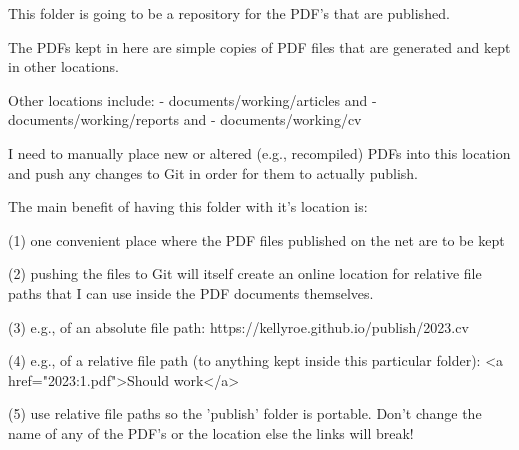 This folder  is going to be a repository for the PDF's that are published.

The PDFs kept in here are simple copies of PDF files that are generated and kept in other locations.

Other locations include: 
- documents/working/articles and 
- documents/working/reports and 
- documents/working/cv

I need to manually place new or altered (e.g., recompiled) PDFs into this location and push any changes to Git in order for them to actually publish.

The main benefit of having this folder with it's location is:

(1) one convenient place where the PDF files published on the net are to be kept

(2) pushing the files to Git will itself create an online location for relative file paths that I can use inside the PDF documents themselves.

(3)  e.g., of an absolute file path:  https://kellyroe.github.io/publish/2023.cv

(4) e.g., of a relative file path (to anything kept inside this particular folder):
<a href="2023:1.pdf">Should work</a> 

(5) use relative file paths so the 'publish' folder is portable.  Don't change the name of any of the PDF's or the location else the links will break!
